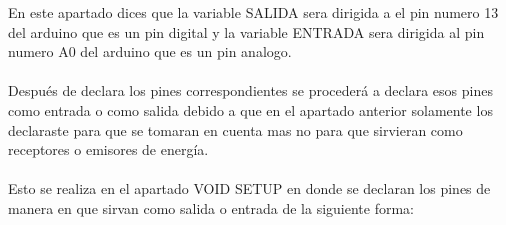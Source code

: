 \documentclass[12pt,a4paper]{article}
\begin{document}
En este apartado dices que la variable SALIDA sera dirigida a el pin numero 13 del arduino que es un pin digital y la variable ENTRADA sera dirigida al pin numero A0 del arduino que es un pin analogo.\\\\
Después de declara los pines correspondientes se procederá a declara esos pines como entrada o como salida debido a que en el apartado anterior solamente los declaraste para que se tomaran en cuenta mas no para que sirvieran como receptores o  emisores de energía.\\\\
Esto se realiza en el apartado VOID SETUP en donde se declaran los pines de manera en que sirvan como salida o entrada de la siguiente forma:\\\\
\end{document}
